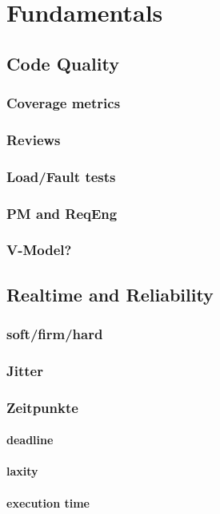 \chapter{Fundamentals}
\label{cha:Fundamentals}
	\section{Code Quality}
	\subsection{Coverage metrics}
	\subsection{Reviews}
	\subsection{Load/Fault tests}
	\subsection{PM and ReqEng}
	\subsection{V-Model?}

	\section{Realtime and Reliability}
	\subsection{soft/firm/hard}
	\subsection{Jitter}
	\subsection{Zeitpunkte}
	\subsubsection{deadline}
	\subsubsection{laxity}
	\subsubsection{execution time}
